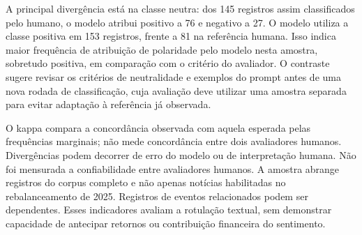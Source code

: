 A principal divergência está na classe neutra: dos 145 registros assim classificados pelo humano, o modelo atribui positivo a 76 e negativo a 27. O modelo utiliza a classe positiva em 153 registros, frente a 81 na referência humana. Isso indica maior frequência de atribuição de polaridade pelo modelo nesta amostra, sobretudo positiva, em comparação com o critério do avaliador. O contraste sugere revisar os critérios de neutralidade e exemplos do prompt antes de uma nova rodada de classificação, cuja avaliação deve utilizar uma amostra separada para evitar adaptação à referência já observada.

O kappa compara a concordância observada com aquela esperada pelas frequências marginais; não mede concordância entre dois avaliadores humanos. Divergências podem decorrer de erro do modelo ou de interpretação humana. Não foi mensurada a confiabilidade entre avaliadores humanos. A amostra abrange registros do corpus completo e não apenas notícias habilitadas no rebalanceamento de 2025. Registros de eventos relacionados podem ser dependentes. Esses indicadores avaliam a rotulação textual, sem demonstrar capacidade de antecipar retornos ou contribuição financeira do sentimento.